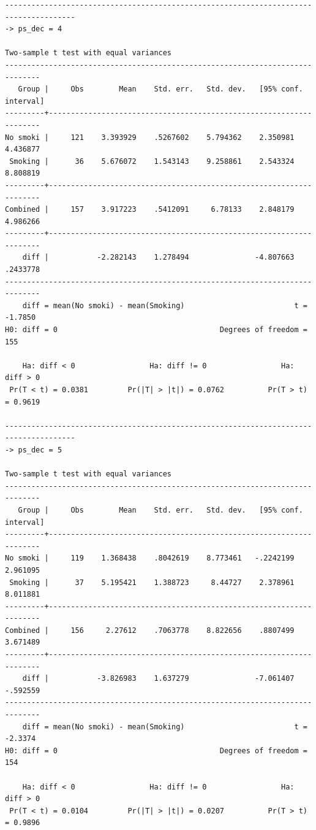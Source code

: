 \documentclass[
  10pt,
  a4paper,
]{book}
\begin{document}
\begin{verbatim}
--------------------------------------------------------------------------------------
-> ps_dec = 4

Two-sample t test with equal variances
------------------------------------------------------------------------------
   Group |     Obs        Mean    Std. err.   Std. dev.   [95% conf. interval]
---------+--------------------------------------------------------------------
No smoki |     121    3.393929    .5267602    5.794362    2.350981    4.436877
 Smoking |      36    5.676072    1.543143    9.258861    2.543324    8.808819
---------+--------------------------------------------------------------------
Combined |     157    3.917223    .5412091     6.78133    2.848179    4.986266
---------+--------------------------------------------------------------------
    diff |           -2.282143    1.278494               -4.807663    .2433778
------------------------------------------------------------------------------
    diff = mean(No smoki) - mean(Smoking)                         t =  -1.7850
H0: diff = 0                                     Degrees of freedom =      155

    Ha: diff < 0                 Ha: diff != 0                 Ha: diff > 0
 Pr(T < t) = 0.0381         Pr(|T| > |t|) = 0.0762          Pr(T > t) = 0.9619

--------------------------------------------------------------------------------------
-> ps_dec = 5

Two-sample t test with equal variances
------------------------------------------------------------------------------
   Group |     Obs        Mean    Std. err.   Std. dev.   [95% conf. interval]
---------+--------------------------------------------------------------------
No smoki |     119    1.368438    .8042619    8.773461   -.2242199    2.961095
 Smoking |      37    5.195421    1.388723     8.44727    2.378961    8.011881
---------+--------------------------------------------------------------------
Combined |     156     2.27612    .7063778    8.822656    .8807499    3.671489
---------+--------------------------------------------------------------------
    diff |           -3.826983    1.637279               -7.061407    -.592559
------------------------------------------------------------------------------
    diff = mean(No smoki) - mean(Smoking)                         t =  -2.3374
H0: diff = 0                                     Degrees of freedom =      154

    Ha: diff < 0                 Ha: diff != 0                 Ha: diff > 0
 Pr(T < t) = 0.0104         Pr(|T| > |t|) = 0.0207          Pr(T > t) = 0.9896


\end{verbatim}
\end{document}
